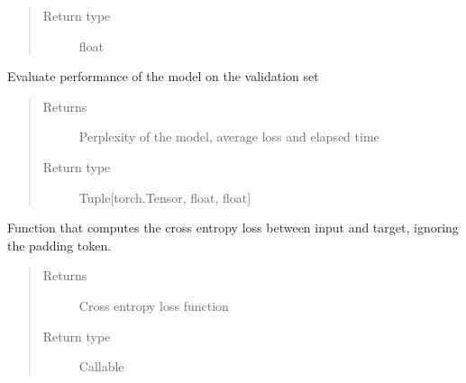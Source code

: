 \documentclass[letterpaper,10pt,english]{sphinxmanual}
\begin{document}
\begin{fulllineitems}
\begin{fulllineitems}
\begin{quote}
\begin{description}
\item[{Return type}] \leavevmode
\sphinxAtStartPar
float

\end{description}\end{quote}

\end{fulllineitems}


\begin{fulllineitems}
\label{\detokenize{code:gpt2_summarizer_train.TrainGPT2Summarizer.eval}}
\sphinxAtStartPar
Evaluate performance of the model on the validation set
\begin{quote}\begin{description}
\item[{Returns}] \leavevmode
\sphinxAtStartPar
Perplexity of the model, average loss and elapsed time

\item[{Return type}] \leavevmode
\sphinxAtStartPar
Tuple{[}torch.Tensor, float, float{]}

\end{description}\end{quote}

\end{fulllineitems}


\begin{fulllineitems}
\label{\detokenize{code:gpt2_summarizer_train.TrainGPT2Summarizer.loss_func}}
\sphinxAtStartPar
Function that computes the cross entropy loss between input and target,
ignoring the padding token.
\begin{quote}\begin{description}
\item[{Returns}] \leavevmode
\sphinxAtStartPar
Cross entropy loss function

\item[{Return type}] \leavevmode
\sphinxAtStartPar
Callable


\end{description}
\end{quote}
\end{fulllineitems}
\end{fulllineitems}
\end{document}
